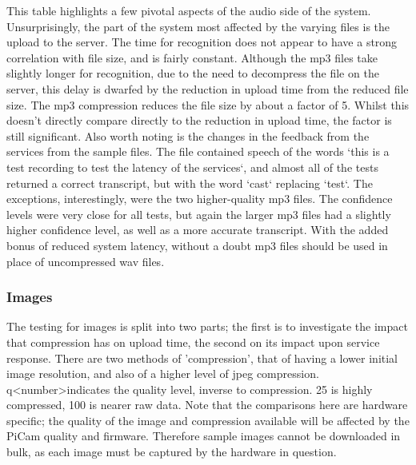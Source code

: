 \documentclass{article}
\begin{document}
This table highlights a few pivotal aspects of the audio side of the system. Unsurprisingly, the part of the system most affected by the varying files is the upload to the server. The time for recognition does not appear to have a strong correlation with file size, and is fairly constant. Although the mp3 files take slightly longer for recognition, due to the need to decompress the file on the server, this delay is dwarfed by the reduction in upload time from the reduced file size. The mp3 compression reduces the file size by about a factor of 5. Whilst this doesn't directly compare directly to the reduction in upload time, the factor is still significant. Also worth noting is the changes in the feedback from the services from the sample files. The file contained speech of the words `this is a test recording to test the latency of the services`, and almost all of the tests returned a correct transcript, but with the word `cast` replacing `test`. The exceptions, interestingly, were the two higher-quality mp3 files. The confidence levels were very close for all tests, but again the larger mp3 files had a slightly higher confidence level, as well as a more accurate transcript. With the added bonus of reduced system latency, without a doubt mp3 files should be used in place of uncompressed wav files.

\subsubsection{Images}
The testing for images is split into two parts; the first is to investigate the impact that compression has on upload time, the second on its impact upon service response. There are two methods of 'compression', that of having a lower initial image resolution, and also of a higher level of jpeg compression. q\textless number\textgreater indicates the quality level, inverse to compression. 25 is highly compressed, 100 is nearer raw data. Note that the comparisons here are hardware specific; the quality of the image and compression available will be affected by the PiCam quality and firmware. Therefore sample images cannot be downloaded in bulk, as each image must be captured by the hardware in question. 
\end{document}
